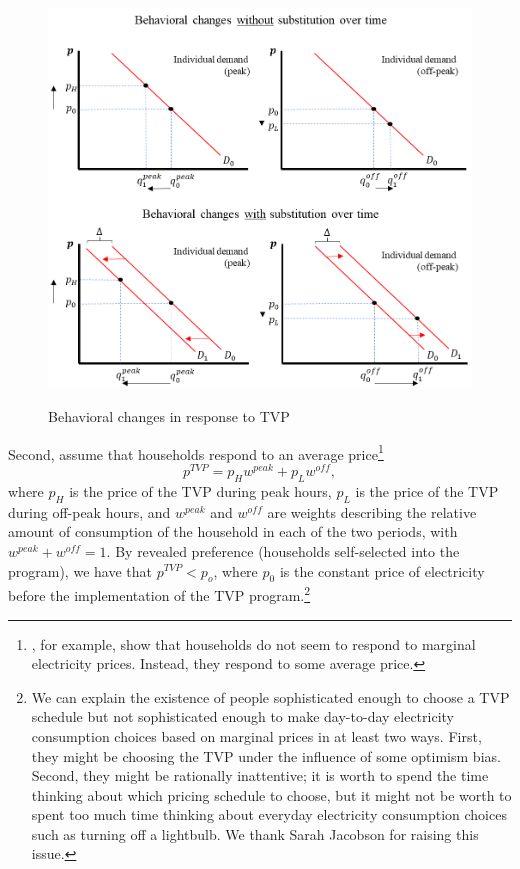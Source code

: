 \documentclass[12pt]{article}
\begin{document}
\begin{figure}[ht]
  \caption{Behavioral changes in response to TVP}\label{fig:four}
  \begin{center}
  {\includegraphics[width=1\textwidth]{./figures/image4.png}}
  \end{center}
\end{figure}

Second, assume that households respond to an average price\footnote{ \citet{itoConsumersRespondMarginal2014}, for example, show that households do not seem to respond to marginal electricity prices. Instead, they respond to some average price.}
\begin{equation}
	p^{TVP} = p_{H} w^{peak} + p_{L} w^{off},
\end{equation}
where $p_{H}$ is the price of the TVP during peak hours, $p_{L}$ is the price of the TVP during off-peak hours, and $w^{peak}$ and $w^{off}$ are weights describing the relative amount of consumption of the household in each of the two periods, with $w^{peak} + w^{off} = 1$. By revealed preference (households self-selected into the program), we have that $p^{TVP} < p_{o}$, where $p_{0}$ is the constant price of electricity before the implementation of the TVP program.\footnote{We can explain the existence of people sophisticated enough to choose a TVP schedule but not sophisticated enough to make day-to-day electricity consumption choices based on marginal prices in at least two ways. First, they might be choosing the TVP under the influence of some optimism bias. Second, they might be rationally inattentive; it is worth to spend the time thinking about which pricing schedule to choose, but it might not be worth to spent too much time thinking about everyday electricity consumption choices such as turning off a lightbulb. We thank Sarah Jacobson for raising this issue.}
\end{document}
